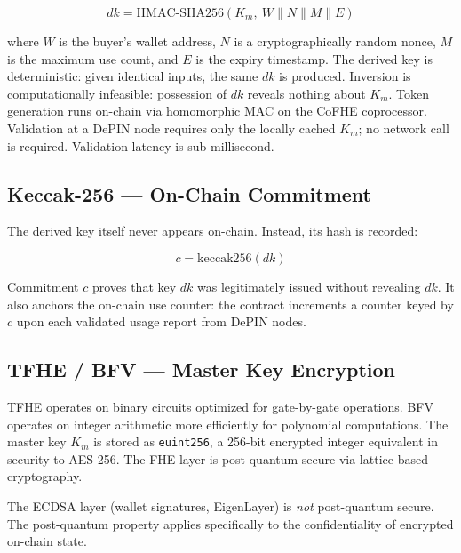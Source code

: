 \documentclass[conference]{IEEEtran}
\begin{document}
\begin{equation}
dk = \mathrm{HMAC\text{-}SHA256}(K_m,\ W \| N \| M \| E)
\label{eq:hmac}
\end{equation}

where $W$ is the buyer's wallet address, $N$ is a cryptographically random nonce,
$M$ is the maximum use count, and $E$ is the expiry timestamp. The derived key is
deterministic: given identical inputs, the same $dk$ is produced. Inversion is
computationally infeasible: possession of $dk$ reveals nothing about $K_m$. Token
generation runs on-chain via homomorphic MAC on the CoFHE coprocessor. Validation
at a DePIN node requires only the locally cached $K_m$; no network call is required.
Validation latency is sub-millisecond.

\subsection{Keccak-256 --- On-Chain Commitment}
The derived key itself never appears on-chain. Instead, its hash is recorded:

\begin{equation}
c = \mathrm{keccak256}(dk)
\label{eq:commitment}
\end{equation}

Commitment $c$ proves that key $dk$ was legitimately issued without revealing $dk$.
It also anchors the on-chain use counter: the contract increments a counter keyed by
$c$ upon each validated usage report from DePIN nodes.

\subsection{TFHE / BFV --- Master Key Encryption}
TFHE \cite{zama_tfhe} operates on binary circuits optimized for gate-by-gate operations.
BFV \cite{bfv} operates on integer arithmetic more efficiently for polynomial computations.
The master key $K_m$ is stored as \texttt{euint256}, a 256-bit encrypted integer equivalent
in security to AES-256. The FHE layer is post-quantum secure via lattice-based cryptography.

The ECDSA layer (wallet signatures, EigenLayer) is \emph{not} post-quantum secure. The
post-quantum property applies specifically to the confidentiality of encrypted on-chain state.
\end{document}
